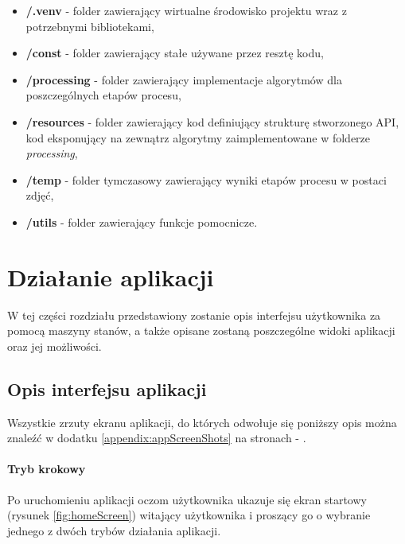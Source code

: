 \begin{itemize}
  \item \textbf{/.venv} - folder zawierający wirtualne środowisko projektu wraz z potrzebnymi
  bibliotekami,
  \item \textbf{/const} - folder zawierający stałe używane przez resztę kodu,
  \item \textbf{/processing} - folder zawierający implementacje algorytmów dla poszczególnych etapów
  procesu,
  \item \textbf{/resources} - folder zawierający kod definiujący strukturę stworzonego API,
  kod eksponujący na zewnątrz algorytmy zaimplementowane w folderze \textit{processing},
  \item \textbf{/temp} - folder tymczasowy zawierający wyniki etapów procesu w postaci zdję\'c,
  \item \textbf{/utils} - folder zawierający funkcje pomocnicze.
\end{itemize}

\section{Działanie aplikacji}

W tej części rozdziału przedstawiony zostanie opis interfejsu użytkownika za pomocą
maszyny stanów, a także opisane zostaną poszczególne widoki aplikacji oraz jej możliwości.

\subsection{Opis interfejsu aplikacji}

\noindent Wszystkie zrzuty ekranu aplikacji, do których odwołuje się poniższy opis można znale\'z\'c w dodatku
\ref{appendix:appScreenShots} na stronach \pageref{fig:homeScreen} - \pageref{fig:batchSingleEntryResult}. \newline

\vspace{-20pt}
\paragraph{Tryb krokowy\newline}

Po uruchomieniu aplikacji oczom użytkownika ukazuje się ekran startowy (rysunek \ref{fig:homeScreen}) witający użytkownika
i proszący go o wybranie jednego z dwóch trybów działania aplikacji.\newline

